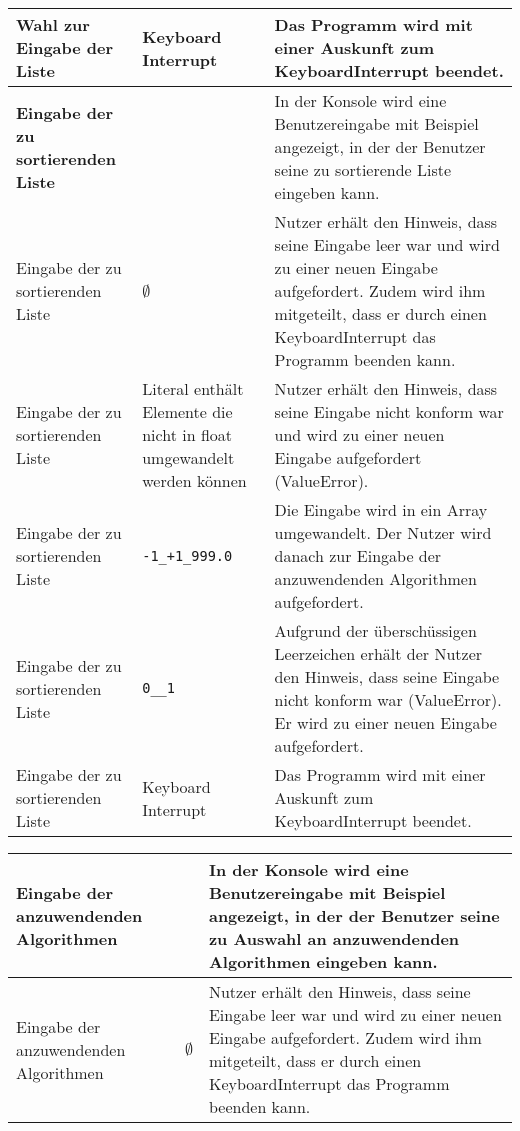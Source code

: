 \documentclass[a4paper]{article}
\begin{document}
\begin{exercise}{1}
\begin{center}
\begin{tabular}{| p{2.5cm} | p{3.2cm} | p{9cm} |}
		Wahl zur Eingabe der Liste & Keyboard Interrupt
		& Das Programm wird mit einer Auskunft zum KeyboardInterrupt beendet.\\ \hline
		
		\textbf{Eingabe der zu sortierenden Liste} & 
		& In der Konsole wird eine Benutzereingabe mit Beispiel angezeigt, in der der Benutzer
		seine zu sortierende Liste eingeben kann. \\ \hline
		
		Eingabe der zu sortierenden Liste & $\emptyset$
		& Nutzer erh\"alt den Hinweis, dass seine Eingabe leer war und wird zu einer neuen Eingabe
		aufgefordert. Zudem wird ihm mitgeteilt, dass er durch einen KeyboardInterrupt das Programm
		beenden kann. \\ \hline
		
		Eingabe der zu sortierenden Liste & Literal enth\"alt Elemente die nicht in float umgewandelt
		werden k\"onnen
		& Nutzer erh\"alt den Hinweis, dass seine Eingabe nicht konform war und wird zu einer
		neuen Eingabe aufgefordert (ValueError).\\ \hline
		
		Eingabe der zu sortierenden Liste & \texttt{-1\_+1\_999.0}
		& Die Eingabe wird in ein Array umgewandelt. Der Nutzer wird danach zur Eingabe der
		anzuwendenden Algorithmen aufgefordert.\\ \hline
		
		Eingabe der zu sortierenden Liste & \texttt{0\_\_1}
		& Aufgrund der \"ubersch\"ussigen Leerzeichen erh\"alt der Nutzer den Hinweis, dass
		seine Eingabe nicht konform war (ValueError). Er wird zu einer neuen Eingabe
		aufgefordert.\\ \hline
		
		Eingabe der zu sortierenden Liste & Keyboard Interrupt
		& Das Programm wird mit einer Auskunft zum KeyboardInterrupt beendet.\\ \hline
	\end{tabular}
	
	
	\begin{tabular}{| p{2.5cm} | p{3.2cm} | p{9cm} |}
		\hline
		\textbf{Eingabe der anzuwendenden Algorithmen} &
		& In der Konsole wird eine Benutzereingabe mit Beispiel angezeigt, in der der Benutzer
		seine zu Auswahl an anzuwendenden Algorithmen eingeben kann.\\ \hline
		
		Eingabe der anzuwendenden Algorithmen & $\emptyset$ &
		Nutzer erh\"alt den Hinweis, dass seine Eingabe leer war und wird zu einer neuen Eingabe
		aufgefordert. Zudem wird ihm mitgeteilt, dass er durch einen KeyboardInterrupt das Programm
		beenden kann. \\ \hline
		

\end{tabular}
\end{center}
\end{exercise}
\end{document}
